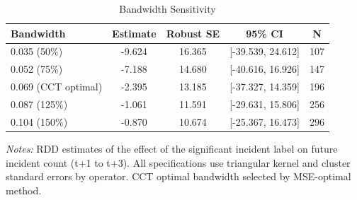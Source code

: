 \begin{table}[htbp]
\centering
\caption{Bandwidth Sensitivity}
\label{tab:bandwidth}
\begin{tabular}{lcccc}
\hline\hline
Bandwidth & Estimate & Robust SE & 95\% CI & N \\
\hline
0.035 (50\%) & -9.624 & 16.365 & [-39.539, 24.612] & 107 \\
0.052 (75\%) & -7.188 & 14.680 & [-40.616, 16.926] & 147 \\
0.069 (CCT optimal) & -2.395 & 13.185 & [-37.327, 14.359] & 196 \\
0.087 (125\%) & -1.061 & 11.591 & [-29.631, 15.806] & 256 \\
0.104 (150\%) & -0.870 & 10.674 & [-25.367, 16.473] & 296 \\
\hline\hline
\end{tabular}
\par\vspace{0.3em}
{\small
\textit{Notes:} RDD estimates of the effect of the significant incident label on future  incident count (t+1 to t+3). All specifications use triangular kernel and cluster standard errors  by operator. CCT optimal bandwidth selected by MSE-optimal method.
}
\end{table}
